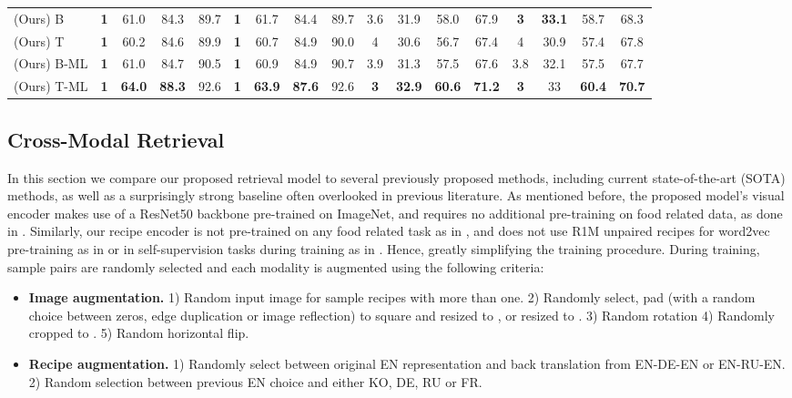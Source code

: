 \documentclass[sigconf,nonacm]{acmart}
\begin{document}
\begin{table*}[!ht]
\begin{tabular}{l|cccc|cccc|cccc|cccc}
	(Ours) B & \textbf{1} & 61.0 & 84.3 & 89.7 & \textbf{1} & 61.7 & 84.4 & 89.7 & 3.6 & 31.9 & 58.0 & 67.9 & \textbf{3} & \textbf{33.1} & 58.7 & 68.3 \\ 
	(Ours) T & \textbf{1} & 60.2 & 84.6 & 89.9 & \textbf{1} & 60.7 & 84.9 & 90.0 & 4 & 30.6 & 56.7 & 67.4 & 4 & 30.9 & 57.4 & 67.8 \\ 
	(Ours) B-ML & \textbf{1} & 61.0 & 84.7 & 90.5 & \textbf{1} & 60.9 & 84.9 & 90.7 & 3.9 & 31.3 & 57.5 & 67.6 & 3.8 & 32.1 & 57.5 & 67.7 \\ 
	(Ours) T-ML & \textbf{1} & \textbf{64.0} & \textbf{88.3} & 92.6 & \textbf{1} & \textbf{63.9} & \textbf{87.6} & 92.6 & \textbf{3} & \textbf{32.9} & \textbf{60.6} & \textbf{71.2} & \textbf{3} & 33 & \textbf{60.4} & \textbf{70.7} \\ 
	\bottomrule
     \end{tabular}

  \label{tab:xretrieval}\end{table*}





\subsection{Cross-Modal Retrieval}

In this section we compare our proposed retrieval model to several previously proposed methods, including current state-of-the-art (SOTA) methods, as well as a surprisingly strong baseline often overlooked in previous literature. As mentioned before, the proposed model's visual encoder  makes use of a ResNet50 backbone pre-trained on ImageNet, and requires no additional pre-training on food related data, as done in \cite{Fain2019,chen2018}. Similarly, our recipe encoder  is not pre-trained on any food related task as in \cite{Fain2019}, and does not use R1M unpaired recipes for word2vec pre-training as in \cite{salvador2017,carvalho2018,Zhu2019,wang2019} or in self-supervision tasks during training as in \cite{salvador2021}. Hence, greatly simplifying the training procedure. During training, sample pairs are randomly selected and each modality is augmented using the following criteria:
\begin{itemize}
    \item \textbf{Image augmentation.} 1) Random input image for sample recipes with more than one. 2) Randomly select, pad (with a random choice between zeros, edge duplication or image reflection) to square and resized to , or resized to . 3) Random rotation  4) Randomly cropped to . 5) Random horizontal flip.

    \item \textbf{Recipe augmentation.} 1) Randomly select between original EN representation and back translation from EN-DE-EN or EN-RU-EN. 2) Random selection between previous EN choice and either KO, DE, RU or FR.
\end{itemize}
\end{document}
